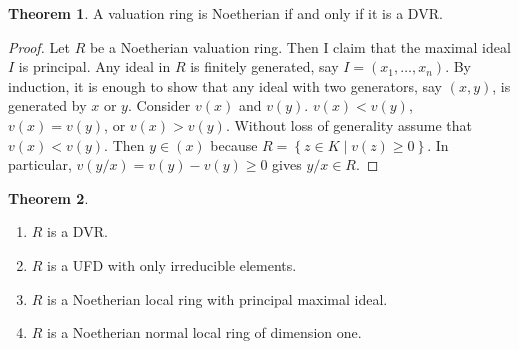 \documentclass{article}
\newcommand{\rb}[1]{\left( #1 \right)}
\newcommand{\cb}[1]{\left\{ #1 \right\}}
\theoremstyle{definition}\newtheorem{definition}{Definition}[section]
\theoremstyle{definition}\newtheorem{remark}[definition]{Remark}
\theoremstyle{definition}\newtheorem*{example}{Example}
\theoremstyle{definition}\newtheorem*{note}{Note}
\newtheorem{theorem}[definition]{Theorem}
\begin{document}
\begin{theorem}
A valuation ring is Noetherian if and only if it is a DVR.
\end{theorem}

\begin{proof}
Let $ R $ be a Noetherian valuation ring. Then I claim that the maximal ideal $ I $ is principal. Any ideal in $ R $ is finitely generated, say $ I = \rb{x_1, \dots, x_n} $. By induction, it is enough to show that any ideal with two generators, say $ \rb{x, y} $, is generated by $ x $ or $ y $. Consider $ v\rb{x} $ and $ v\rb{y} $. $ v\rb{x} < v\rb{y} $, $ v\rb{x} = v\rb{y} $, or $ v\rb{x} > v\rb{y} $. Without loss of generality assume that $ v\rb{x} < v\rb{y} $. Then $ y \in \rb{x} $ because $ R = \cb{z \in K \mid v\rb{z} \ge 0} $. In particular, $ v\rb{y / x} = v\rb{y} - v\rb{y} \ge 0 $ gives $ y / x \in R $.
\end{proof}


\begin{theorem}
\hfill
\begin{enumerate}
\item $ R $ is a DVR.
\item $ R $ is a UFD with only irreducible elements.
\item $ R $ is a Noetherian local ring with principal maximal ideal.
\item $ R $ is a Noetherian normal local ring of dimension one.
\end{enumerate}
\end{theorem}
\end{document}
